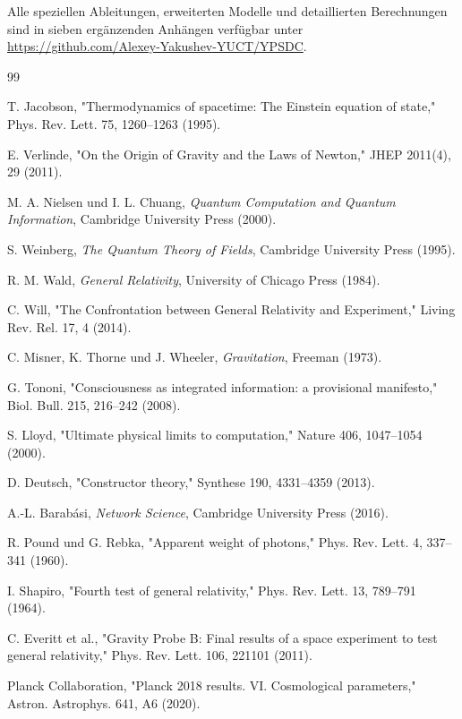 \documentclass[11pt,a4paper]{article}
\begin{document}
	Alle speziellen Ableitungen, erweiterten Modelle und detaillierten Berechnungen 
	sind in sieben ergänzenden Anhängen verfügbar unter 
	\url{https://github.com/Alexey-Yakushev-YUCT/YPSDC}.
	\begin{thebibliography}{99}
		
		 T. Jacobson, "Thermodynamics of spacetime: The Einstein equation of state," Phys. Rev. Lett. 75, 1260–1263 (1995).
		
		 E. Verlinde, "On the Origin of Gravity and the Laws of Newton," JHEP 2011(4), 29 (2011).
		
		 M. A. Nielsen und I. L. Chuang, \emph{Quantum Computation and Quantum Information}, Cambridge University Press (2000).
		
		 S. Weinberg, \emph{The Quantum Theory of Fields}, Cambridge University Press (1995).
		
		 R. M. Wald, \emph{General Relativity}, University of Chicago Press (1984).
		
		 C. Will, "The Confrontation between General Relativity and Experiment," Living Rev. Rel. 17, 4 (2014).
		
		 C. Misner, K. Thorne und J. Wheeler, \emph{Gravitation}, Freeman (1973).
		
		 G. Tononi, "Consciousness as integrated information: a provisional manifesto," Biol. Bull. 215, 216–242 (2008).
		
		 S. Lloyd, "Ultimate physical limits to computation," Nature 406, 1047–1054 (2000).
		
		 D. Deutsch, "Constructor theory," Synthese 190, 4331–4359 (2013).
		
		 A.-L. Barabási, \emph{Network Science}, Cambridge University Press (2016).
		
		 R. Pound und G. Rebka, "Apparent weight of photons," Phys. Rev. Lett. 4, 337–341 (1960).
		
		 I. Shapiro, "Fourth test of general relativity," Phys. Rev. Lett. 13, 789–791 (1964).
		
		 C. Everitt et al., "Gravity Probe B: Final results of a space experiment to test general relativity," Phys. Rev. Lett. 106, 221101 (2011).
		
		 Planck Collaboration, "Planck 2018 results. VI. Cosmological parameters," Astron. Astrophys. 641, A6 (2020).
		

\end{thebibliography}
\end{document}
